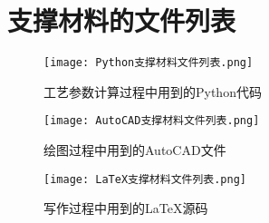 \chapter{支撑材料的文件列表}



\begin{figure}[H]
	\centering
	\texttt{[image: Python支撑材料文件列表.png]}
	\caption{工艺参数计算过程中用到的Python代码}
\end{figure}



\begin{figure}[H]
	\centering
	\texttt{[image: AutoCAD支撑材料文件列表.png]}
	\caption{绘图过程中用到的AutoCAD文件}
\end{figure}



\begin{figure}[H]
	\centering
	\texttt{[image: LaTeX支撑材料文件列表.png]}
	\caption{写作过程中用到的LaTeX源码}
\end{figure}



\cleardoublepage